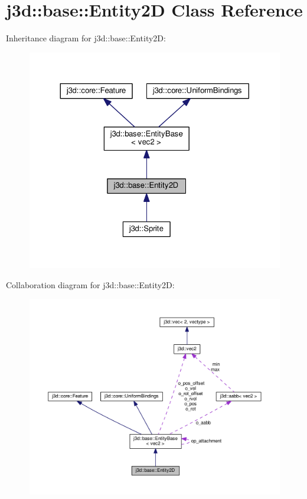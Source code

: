 \hypertarget{classj3d_1_1base_1_1Entity2D}{}\section{j3d\+:\+:base\+:\+:Entity2\+D Class Reference}
\label{classj3d_1_1base_1_1Entity2D}


Inheritance diagram for j3d\+:\+:base\+:\+:Entity2\+D\+:
\nopagebreak
\begin{figure}[H]
\begin{center}
\leavevmode
\includegraphics[width=324pt]{classj3d_1_1base_1_1Entity2D__inherit__graph}
\end{center}
\end{figure}


Collaboration diagram for j3d\+:\+:base\+:\+:Entity2\+D\+:
\nopagebreak
\begin{figure}[H]
\begin{center}
\leavevmode
\includegraphics[width=350pt]{classj3d_1_1base_1_1Entity2D__coll__graph}
\end{center}
\end{figure}
